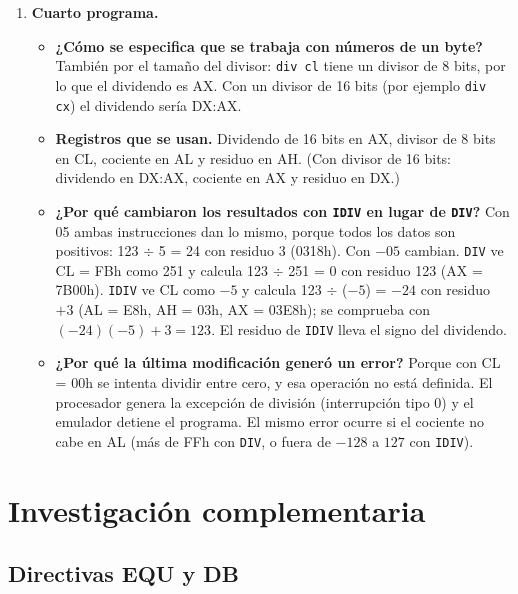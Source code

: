 \documentclass[10pt]{article}
\begin{document}
\begin{enumerate}
  \item \textbf{Cuarto programa.}
  \begin{itemize}
    \item \textbf{¿Cómo se especifica que se trabaja con números de un byte?} También por el tamaño del divisor: \texttt{div cl} tiene un divisor de 8 bits, por lo que el dividendo es AX. Con un divisor de 16 bits (por ejemplo \texttt{div cx}) el dividendo sería DX:AX.
    \item \textbf{Registros que se usan.} Dividendo de 16 bits en AX, divisor de 8 bits en CL, cociente en AL y residuo en AH. (Con divisor de 16 bits: dividendo en DX:AX, cociente en AX y residuo en DX.)
    \item \textbf{¿Por qué cambiaron los resultados con \texttt{IDIV} en lugar de \texttt{DIV}?} Con 05 ambas instrucciones dan lo mismo, porque todos los datos son positivos: 123 $\div$ 5 = 24 con residuo 3 (0318h). Con $-05$ cambian. \texttt{DIV} ve CL = FBh como 251 y calcula 123 $\div$ 251 = 0 con residuo 123 (AX = 7B00h). \texttt{IDIV} ve CL como $-5$ y calcula 123 $\div$ ($-5$) = $-24$ con residuo $+3$ (AL = E8h, AH = 03h, AX = 03E8h); se comprueba con $(-24)(-5) + 3 = 123$. El residuo de \texttt{IDIV} lleva el signo del dividendo.
    \item \textbf{¿Por qué la última modificación generó un error?} Porque con CL = 00h se intenta dividir entre cero, y esa operación no está definida. El procesador genera la excepción de división (interrupción tipo 0) y el emulador detiene el programa. El mismo error ocurre si el cociente no cabe en AL (más de FFh con \texttt{DIV}, o fuera de $-128$ a $127$ con \texttt{IDIV}).
  \end{itemize}
\end{enumerate}
 
\section{Investigación complementaria}
 
\subsection{Directivas EQU y DB}
 
\end{document}
